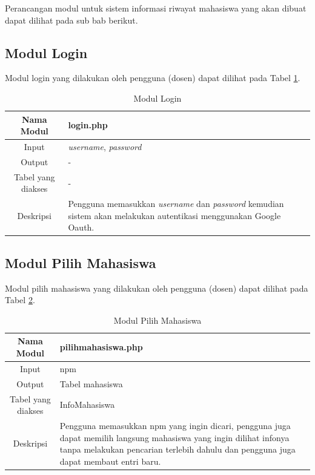 Perancangan modul untuk sistem informasi riwayat mahasiswa yang akan dibuat
dapat dilihat pada sub bab berikut.

\subsection{Modul Login}
Modul login yang dilakukan oleh pengguna (dosen) dapat dilihat pada Tabel
\ref{tab:modullogin}.

\begin{table}[h]
\centering
\caption[Tabel Modul Login]{Modul Login}
\label{tab:modullogin}
\begin{tabular}{|c|p{7cm}|}
\hline
Nama Modul & login.php\\
\hline
Input & {\it username}, {\it password}\\
\hline
Output & -\\
\hline
Tabel yang diakses & -\\
\hline
Deskripsi & Pengguna memasukkan {\it username} dan {\it password} kemudian
sistem akan melakukan autentikasi menggunakan Google Oauth.\\
\hline
\end{tabular}
\end{table}

\subsection{Modul Pilih Mahasiswa}
Modul pilih mahasiswa yang dilakukan oleh pengguna (dosen) dapat dilihat pada
Tabel \ref{tab:modulpilihmahasiswa}.

\begin{table}[h]
\centering
\caption[Tabel Modul Pilih Mahasiswa]{Modul Pilih Mahasiswa}
\label{tab:modulpilihmahasiswa}
\begin{tabular}{|c|p{7cm}|}
\hline
Nama Modul & pilihmahasiswa.php\\
\hline
Input & npm\\
\hline
Output & Tabel mahasiswa\\
\hline
Tabel yang diakses & InfoMahasiswa\\
\hline
Deskripsi & Pengguna memasukkan npm yang ingin dicari, pengguna juga dapat
memilih langsung mahasiswa yang ingin dilihat infonya tanpa melakukan pencarian
terlebih dahulu dan pengguna juga dapat membaut entri baru.\\
\hline
\end{tabular}
\end{table}

